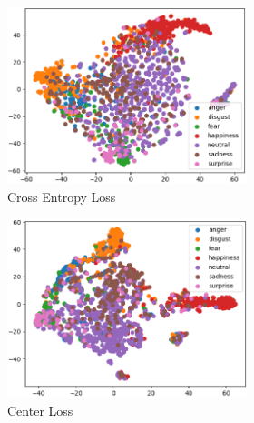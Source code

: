 \begin{figure}[ht]
    \begin{subfigure}{\textwidth}
	\centering
        \begin{subfigure}{0.32\textwidth}
            \includegraphics[width=\linewidth]{Images/Features/CE_5.png}
            \caption{Cross Entropy Loss}
            \label{CE_5}
        \end{subfigure}
        \begin{subfigure}{0.32\textwidth}
            \includegraphics[width=\linewidth]{Images/Features/Center_5.png}
            \caption{Center Loss}
            \label{Center_5}
        \end{subfigure}
        \begin{subfigure}{0.32\textwidth}

\end{subfigure}
\end{subfigure}
\end{figure}
